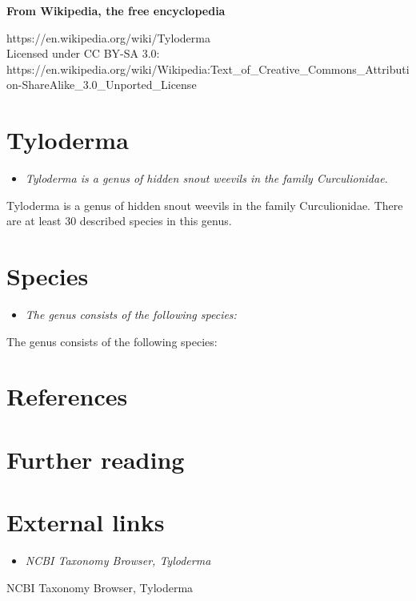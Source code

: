\textbf{From Wikipedia, the free encyclopedia}

https://en.wikipedia.org/wiki/Tyloderma\\
Licensed under CC BY-SA 3.0:\\
https://en.wikipedia.org/wiki/Wikipedia:Text\_of\_Creative\_Commons\_Attribution-ShareAlike\_3.0\_Unported\_License

\section{Tyloderma}\label{tyloderma}

\begin{itemize}
\item
  \emph{Tyloderma is a genus of hidden snout weevils in the family
  Curculionidae.}
\end{itemize}

Tyloderma is a genus of hidden snout weevils in the family
Curculionidae. There are at least 30 described species in this genus.

\section{Species}\label{species}

\begin{itemize}
\item
  \emph{The genus consists of the following species:}
\end{itemize}

The genus consists of the following species:

\section{References}\label{references}

\section{Further reading}\label{further-reading}

\section{External links}\label{external-links}

\begin{itemize}
\item
  \emph{NCBI Taxonomy Browser, Tyloderma}
\end{itemize}

NCBI Taxonomy Browser, Tyloderma
